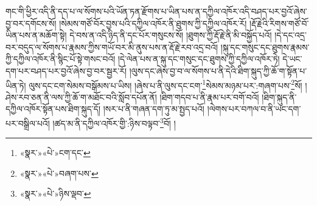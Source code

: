 གང་གི་ཕྱིར་འདི་ནི་དད་པ་ལ་སོགས་པའི་ཡོན་ཏན་རྫོགས་པ་ཡིན་པས་ན་དཀྱིལ་འཁོར་འདི་བཤད་པར་བྱའོ་ཞེས་བྱ་བར་དགོངས་སོ། །སེམས་གཙོ་བོར་བྱས་པའི་དཀྱིལ་འཁོར་ནི་ཐུགས་ཀྱི་དཀྱིལ་འཁོར་རོ། །རྡོ་རྗེའི་རིགས་གཙོ་བོ་ཡིན་པས་ན་མཆོག་སྟེ། དེ་བས་ན་འདི་ཉིད་ནི་དང་པོར་གསུངས་སོ། །ཐུགས་ཀྱི་རྡོ་རྗེ་ནི་མི་བསྐྱོད་པའོ། །དེ་དང་འདྲ་བར་བདུད་ལ་སོགས་པ་རྣམས་ཀྱིས་གཡོ་བར་མི་ནུས་པས་ན་རྡོ་རྗེ་རབ་འདྲ་བའོ། །སྐུ་དང་གསུང་དང་ཐུགས་རྣམས་ཀྱི་དཀྱིལ་འཁོར་ནི་སྙིང་པོ་སྟེ་གསང་བའོ། །དེ་ལེན་པས་ན་སྐུ་དང་གསུང་དང་ཐུགས་ཀྱི་དཀྱིལ་འཁོར་ཏེ། དེ་ཡང་དག་པར་བཤད་པར་བྱའོ་ཞེས་བྱ་བར་སྦྱར་རོ། །ལུས་དང་ཞེས་བྱ་བ་ལ་སོགས་པ་ནི་དེའི་ཐིག་སྐུད་ཀྱི་ཆོ་ག་སྟོན་པ་ཡིན་ཏེ། ལུས་དང་ངག་སེམས་བསྒོམས་པ་ཡིས། །ཞེས་པ་ནི་ལུས་དང་ངག་\footnote{«སྣར་»«པེ་»ངག་དང་}སེམས་མཉམ་པར་:གཞག་པས་\footnote{«སྣར་»«པེ་»བཞག་པས་}སོ། །ཤེས་རབ་ཅན་ནི་ལས་ཀྱི་ཆོ་ག་མཐོང་བའི་སློབ་དཔོན་ནོ། །ཐིག་གདབ་པ་ནི་རྣམ་པར་བགོ་བའོ། །ཐིག་སྐུད་ནི་དཀྱིལ་འཁོར་སྟོན་པས་ཐིག་སྐུད་དོ། །སར་པ་ནི་གཞན་དག་ཏུ་མ་སྤྱད་པའོ། །ལེགས་པར་བཀལ་བ་ནི་ཡང་དག་པར་བསྒྲིལ་པའོ། །ཚད་མ་ནི་དཀྱིལ་འཁོར་གྱི་:ཉིས་བལྟབ་\footnote{«སྣར་»«པེ་»ཉིས་ལྡབ་}བོ། །
